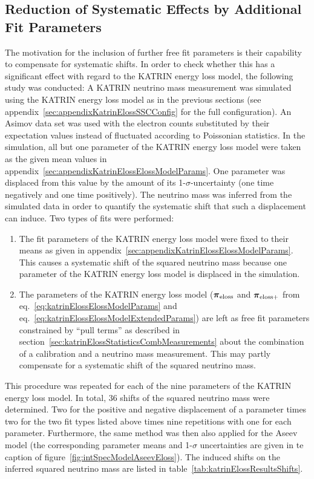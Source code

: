 \subsection{Reduction of Systematic Effects by Additional Fit Parameters}
The motivation for the inclusion of further free fit parameters is their capability to compensate for systematic shifts. In order to check whether this has a significant effect with regard to the KATRIN energy loss model, the following study was conducted: A KATRIN neutrino mass measurement was simulated using the KATRIN energy loss model as in the previous sections (see appendix~\ref{sec:appendixKatrinElossSSCConfig} for the full configuration). An Asimov data set was used with the electron counts substituted by their expectation values instead of fluctuated according to Poissonian statistics. In the simulation, all but one parameter of the KATRIN energy loss model were taken as the given mean values in appendix~\ref{sec:appendixKatrinElossElossModelParams}. One parameter was displaced from this value by the amount of its 1-$\sigma$-uncertainty (one time negatively and one time positively). The neutrino mass was inferred from the simulated data in order to quantify the systematic shift that such a displacement can induce. Two types of fits were performed:
\begin{enumerate}
	\item The fit parameters of the KATRIN energy loss model were fixed to their means as given in appendix~\ref{sec:appendixKatrinElossElossModelParams}. This causes a systematic shift of the squared neutrino mass because one parameter of the KATRIN energy loss model is displaced in the simulation.
	
	\item The parameters of the KATRIN energy loss model ($\boldsymbol{\mathbf{\pi}}_\mathrm{eloss}$ and $\boldsymbol{\mathbf{\pi}}_\mathrm{eloss+}$ from eq.~\ref{eq:katrinElossElossModelParams} and eq.~\ref{eq:katrinElossElossModelExtendedParams}) are left as free fit parameters constrained by ``pull terms'' as described in section~\ref{sec:katrinElossStatisticsCombMeasurements} about the combination of a calibration and a neutrino mass measurement. This may partly compensate for a systematic shift of the squared neutrino mass.
	\end{enumerate}
This procedure was repeated for each of the nine parameters of the KATRIN energy loss model. In total, 36 shifts of the squared neutrino mass were determined. Two for the positive and negative displacement of a parameter times two for the two fit types listed above times nine repetitions with one for each parameter. Furthermore, the same method was then also applied for the Aseev model (the corresponding parameter means and 1-$\sigma$ uncertainties are given in te caption of figure~\ref{fig:intSpecModelAseevEloss}). The induced shifts on the inferred squared neutrino mass are listed in table~\ref{tab:katrinElossResultsShifts}. 

